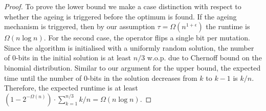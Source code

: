 \documentclass[lettersize,journal]{IEEEtran}
\begin{document}
\begin{proof}
To prove the lower bound we make a case distinction with respect to whether the ageing is triggered before the optimum is found. If the ageing mechanism is triggered, then by our assumption $\tau=\Omega(n^{1+\epsilon})$ the runtime is $\Omega(n \log n)$. For the second case, the operator flips a single bit per mutation. Since the algorithm is initialised with a uniformly random solution, the number of $0$-bits in the initial solution is at least $n/3$ w.o.p. due to Chernoff bound on the binomial distribution. Similar to our argument for the upper bound, the expected time until the number of $0$-bits in the solution decreases from $k$ to $k-1$ is $k/n$. Therefore, the expected runtime is  at least $(1-2^{-\Omega(n)}) \cdot \sum_{k=1}^{n/3} k/n = \Omega(n \log n)$. 
\end{proof}
\end{document}
